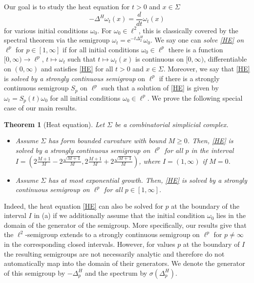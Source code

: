 \documentclass[10pt]{amsart}
\newtheorem{theorem}{Theorem}[section]
\theoremstyle{definition}
\begin{document}
Our goal is to study the heat equation for $t>0$ and $x\in  \Sigma$
\begin{equation} \tag{HE} \label{HE}
     -\Delta^H \omega_t (x)= \frac{d}{dt}\omega_t(x)     
\end{equation}
for various initial conditions $\omega_0.$ For $\omega_0\in \ell^2$, this is classically covered by the spectral theorem via the semigroup $\omega_t = \mathrm{e}^{-t\Delta^H_2}\omega_0$. 
We say one can \emph{solve \eqref{HE} on $\ell^p$} for $p\in [1,\infty]$ if for all initial conditions $\omega_0\in\ell^p$ there is a  function
$[0,\infty)\rightarrow\ell^p$, $t\mapsto \omega_t$ such that $t\mapsto \omega_t(x)$ is  continuous on $[0,\infty)$, differentiable on $(0,\infty)$ and satisfies \eqref{HE} for all $t>0$ and $x\in \Sigma$.
Moreover, we say that \eqref{HE} is \emph{solved by a strongly continuous semigroup} on $\ell^p$ if there is a strongly continuous semigroup $S_p$ on $\ell^p$ such that a solution of \ref{HE} is given by $\omega_t = S_p(t)\omega_0$ for all initial conditions $\omega_0\in\ell^p.$
We prove the following special case of our main results. %

\begin{theorem}[Heat equation]\label{thm:HE}
    Let $  \Sigma$ be a combinatorial simplicial complex. 
    \begin{itemize}
        \item [(a)] Assume $  \Sigma$ has form bounded curvature with bound $M\geq 0$. Then,  \eqref{HE} is solved by a strongly continuous semigroup on $\ell^p$ for all 
    $p$ in the interval $ I=  (2\frac{M+1}{M}-2\frac{\sqrt{M+1}}{M},2\frac{M+1}{M}+2\frac{\sqrt{M+1}}{M})$, where $I=(1,\infty)$ if $M=0$.
 \item [(b)] Assume $  \Sigma$ has at most exponential growth. Then,  \eqref{HE} is solved by a strongly continuous semigroup on $\ell^p$ for all 
    $p\in  [1,\infty]$. 
    \end{itemize}
\end{theorem}

Indeed, the heat equation \eqref{HE} can also be solved for $p$ at the boundary  of the interval $I$ in (a)  if we additionally assume that the initial condition $\omega_0$ lies in the domain of the generator of the semigroup. More specifically, our results give that the $\ell^2$-semigroup extends to a strongly continuous semigroup on $\ell^p$ for $p\neq\infty$ in the corresponding closed intervals. However, for values $p$ at the boundary of $I$ the resulting semigroups are not necessarily analytic and therefore do not automatically map into the domain of their generators.
We denote the generator of this semigroup by $-\Delta^H_p$ and the spectrum by $\sigma(\Delta^H_p).$ 
\end{document}
